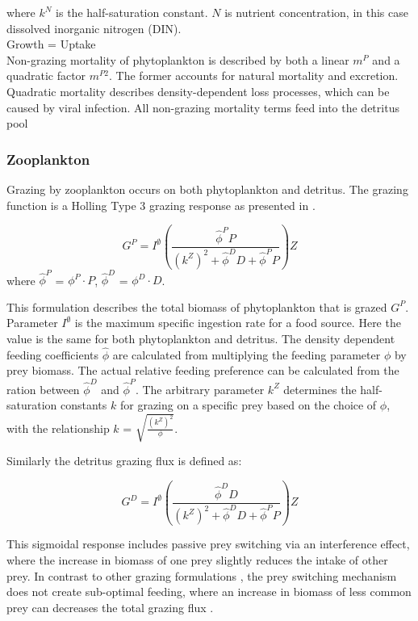 \documentclass[template.tex]{subfiles}
\begin{document}
where $k^N$ is the half-saturation constant. $N$ is nutrient concentration, in this case dissolved inorganic nitrogen (DIN).\\

Growth = Uptake\\

Non-grazing mortality of phytoplankton is described by both a linear $m^P$ and a quadratic factor $m^{P2}$. The former accounts for natural mortality and excretion. Quadratic mortality describes density-dependent loss processes, which can be caused by viral infection. All non-grazing mortality terms feed into the detritus pool

\subsubsection{Zooplankton}
Grazing by zooplankton occurs on both phytoplankton and detritus. The grazing function is a Holling Type 3 grazing response as presented in \citet{Anderson2015c}.

\begin{equation}
    G^P = I^{\emptyset} \left( \frac{ \hat{\phi}^P P}{(k^Z)^2 + \hat{\phi}^D D +\hat{\phi}^P P}  \right) Z
\end{equation}
where $\hat{\phi}^P$ = $\phi^P \cdot P$, $\hat{\phi}^D$ = $\phi^D \cdot D$.

This formulation describes the total biomass of phytoplankton that is grazed $G^P$. Parameter $I^{\emptyset}$ is the maximum specific ingestion rate for a food source. Here the value is the same for both phytoplankton and detritus. The density dependent feeding coefficients $\hat{\phi}$ are calculated from multiplying the feeding parameter $\phi$ by prey biomass. The actual relative feeding preference can be calculated from the ration between $\hat{\phi}^D$ and $\hat{\phi}^P$. The arbitrary parameter $k^Z$ determines the half-saturation constants $k$ for grazing on a specific prey based on the choice of $\phi$, with the relationship $k$ = $\sqrt{\frac{(k^Z)^2 }{ \phi}}$.

Similarly the detritus grazing flux is defined as:

\begin{equation}
    G^D = I^{\emptyset} \left( \frac{ \hat{\phi}^D D}{(k^Z)^2 + \hat{\phi}^D D +\hat{\phi}^P P}  \right) Z
\end{equation}

This sigmoidal response includes passive prey switching via an interference effect, where the increase in biomass of one prey slightly reduces the intake of other prey. In contrast to other grazing formulations \citep[e.g.][]{Fasham1990a}, the prey switching mechanism does not create sub-optimal feeding, where an increase in biomass of less common prey can decreases the total grazing flux \citep{Gentleman2003a}.
\end{document}
